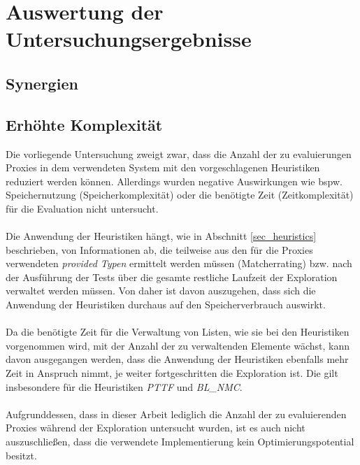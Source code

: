 \section{Auswertung der Untersuchungsergebnisse}
\subsection{Synergien}
\subsection{Erhöhte Komplexität}
Die vorliegende Untersuchung zweigt zwar, dass die Anzahl der zu evaluierungen Proxies in dem verwendeten System mit den vorgeschlagenen Heuristiken reduziert werden können. Allerdings wurden negative Auswirkungen wie bspw. Speichernutzung (Speicherkomplexität) oder die benötigte Zeit  (Zeitkomplexität) für die Evaluation nicht untersucht.
\\\\
Die Anwendung der Heuristiken hängt, wie in Abschnitt \ref{sec_heuristics} beschrieben, von Informationen ab, die teilweise aus den für die Proxies verwendeten \emph{provided Typen} ermittelt werden müssen (Matcherrating) bzw. nach der Ausführung der Tests über die gesamte restliche Laufzeit der Exploration verwaltet werden müssen. Von daher ist davon auszugehen, dass sich die Anwendung der Heuristiken durchaus auf den Speicherverbrauch auswirkt.
\\\\
Da die benötigte Zeit für die Verwaltung von Listen, wie sie bei den Heuristiken vorgenommen wird, mit der Anzahl der zu verwaltenden Elemente wächst, kann davon ausgegangen werden, dass die Anwendung der Heuristiken ebenfalls mehr Zeit in Anspruch nimmt, je weiter fortgeschritten die Exploration ist. Die gilt insbesondere für die Heuristiken \emph{PTTF} und \emph{BL\_NMC}. 
\\\\
Aufgrunddessen, dass in dieser Arbeit lediglich die Anzahl der zu evaluierenden Proxies während der Exploration untersucht wurden, ist es auch nicht auszuschließen, dass die verwendete Implementierung kein Optimierungspotential besitzt.